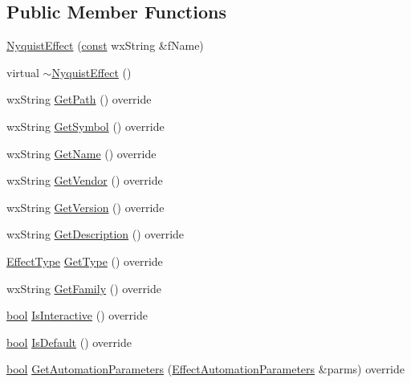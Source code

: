 \subsection*{Public Member Functions}
\begin{DoxyCompactItemize}
\item 
\hyperlink{class_nyquist_effect_abc268a0926620be1f81348fa74188a14}{Nyquist\+Effect} (\hyperlink{getopt1_8c_a2c212835823e3c54a8ab6d95c652660e}{const} wx\+String \&f\+Name)
\item 
virtual \hyperlink{class_nyquist_effect_a61ff46b2f3410bf9c88864791c8773bc}{$\sim$\+Nyquist\+Effect} ()
\item 
wx\+String \hyperlink{class_nyquist_effect_a223e5fb5c26b764116b84030544a28fd}{Get\+Path} () override
\item 
wx\+String \hyperlink{class_nyquist_effect_aaeee1858b2a126b3bd31a7c16476a54c}{Get\+Symbol} () override
\item 
wx\+String \hyperlink{class_nyquist_effect_a602ac339c1626c92fd4449beba4bba82}{Get\+Name} () override
\item 
wx\+String \hyperlink{class_nyquist_effect_a8cbc83ceab2a36311ada4c651e6c86f4}{Get\+Vendor} () override
\item 
wx\+String \hyperlink{class_nyquist_effect_a6c44dfb61e1120a907120f559dea4c84}{Get\+Version} () override
\item 
wx\+String \hyperlink{class_nyquist_effect_a623174d25973d1d47d20f89ac36737f3}{Get\+Description} () override
\item 
\hyperlink{_effect_interface_8h_a4809a7bb3fd1a421902a667cc1405d43}{Effect\+Type} \hyperlink{class_nyquist_effect_a96cf49368fa9dd4e54a59b5849c11ec4}{Get\+Type} () override
\item 
wx\+String \hyperlink{class_nyquist_effect_ad46c8bafef2e588bbc2fa848fc4e9f2e}{Get\+Family} () override
\item 
\hyperlink{mac_2config_2i386_2lib-src_2libsoxr_2soxr-config_8h_abb452686968e48b67397da5f97445f5b}{bool} \hyperlink{class_nyquist_effect_add38c61a5714b780d808e0123e9d92b7}{Is\+Interactive} () override
\item 
\hyperlink{mac_2config_2i386_2lib-src_2libsoxr_2soxr-config_8h_abb452686968e48b67397da5f97445f5b}{bool} \hyperlink{class_nyquist_effect_a1575fd498371f9888ba2794a90c61c83}{Is\+Default} () override
\item 
\hyperlink{mac_2config_2i386_2lib-src_2libsoxr_2soxr-config_8h_abb452686968e48b67397da5f97445f5b}{bool} \hyperlink{class_nyquist_effect_a7506be1280fb433e7a2f90d0b9ab96b8}{Get\+Automation\+Parameters} (\hyperlink{class_effect_automation_parameters}{Effect\+Automation\+Parameters} \&parms) override

\end{DoxyCompactItemize}
